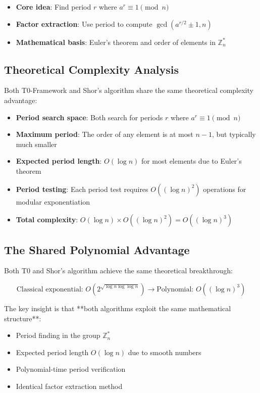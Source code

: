 \documentclass[12pt,a4paper]{article}
\begin{document}
	\begin{itemize}
		\item \textbf{Core idea}: Find period $r$ where $a^r \equiv 1 \pmod{n}$
		\item \textbf{Factor extraction}: Use period to compute $\gcd(a^{r/2} \pm 1, n)$
		\item \textbf{Mathematical basis}: Euler's theorem and order of elements in $\mathbb{Z}_n^*$
	\end{itemize}
	
	\subsection{Theoretical Complexity Analysis}
	
	Both T0-Framework and Shor's algorithm share the same theoretical complexity advantage:
	
	\begin{itemize}
		\item \textbf{Period search space}: Both search for periods $r$ where $a^r \equiv 1 \pmod{n}$
		\item \textbf{Maximum period}: The order of any element is at most $n-1$, but typically much smaller
		\item \textbf{Expected period length}: $O(\log n)$ for most elements due to Euler's theorem
		\item \textbf{Period testing}: Each period test requires $O((\log n)^2)$ operations for modular exponentiation
		\item \textbf{Total complexity}: $O(\log n) \times O((\log n)^2) = O((\log n)^3)$
	\end{itemize}
	
	\subsection{The Shared Polynomial Advantage}
	
	Both T0 and Shor's algorithm achieve the same theoretical breakthrough:
	
	\begin{equation}
		\text{Classical exponential: } O(2^{\sqrt{\log n \log \log n}}) \rightarrow \text{Polynomial: } O((\log n)^3)
	\end{equation}
	
	The key insight is that **both algorithms exploit the same mathematical structure**:
	\begin{itemize}
		\item Period finding in the group $\mathbb{Z}_n^*$
		\item Expected period length $O(\log n)$ due to smooth numbers
		\item Polynomial-time period verification
		\item Identical factor extraction method
	\end{itemize}
	
\end{document}
